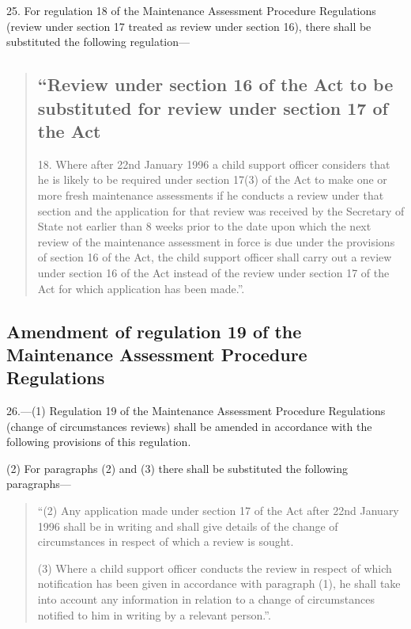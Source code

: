 \documentclass[12pt,a4paper]{article}
\begin{document}
25.  For regulation 18 of the Maintenance Assessment Procedure Regulations (review under section 17 treated as review under section 16), there shall be substituted the following regulation—
\begin{quotation}
\subsection*{“Review under section 16 of the Act to be substituted for review under section 17 of the Act}

18.  Where after 22nd January 1996 a child support officer considers that he is likely to be required under section 17(3) of the Act to make one or more fresh maintenance assessments if he conducts a review under that section and the application for that review was received by the Secretary of State not earlier than 8 weeks prior to the date upon which the next review of the maintenance assessment in force is due under the provisions of section 16 of the Act, the child support officer shall carry out a review under section 16 of the Act instead of the review under section 17 of the Act for which application has been made.”.
\end{quotation}

\subsection[26. Amendment of regulation 19 of the Maintenance Assessment Procedure Regulations]{Amendment of regulation 19 of the Maintenance Assessment Procedure Regulations}

26.—(1) Regulation 19 of the Maintenance Assessment Procedure Regulations (change of circumstances reviews) shall be amended in accordance with the following provisions of this regulation.

(2) For paragraphs (2) and (3) there shall be substituted the following paragraphs—
\begin{quotation}
“(2) Any application made under section 17 of the Act after 22nd January 1996 shall be in writing and shall give details of the change of circumstances in respect of which a review is sought.

(3) Where a child support officer conducts the review in respect of which notification has been given in accordance with paragraph (1), he shall take into account any information in relation to a change of circumstances notified to him in writing by a relevant person.”.
\end{quotation}
\end{document}
